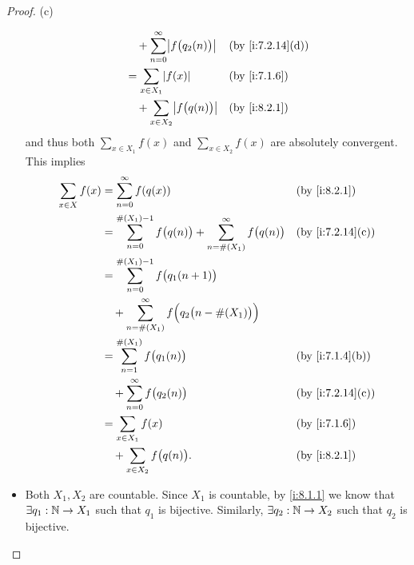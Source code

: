\begin{proof}{(c)}
\begin{itemize}
\begin{align*}
                                      & \quad + \sum_{n = 0}^\infty \abs{f\big(q_2(n)\big)}                                                  &  & \by{i:7.2.14}[d] \\
                                      & = \sum_{x \in X_1} \abs{f(x)}                                                                        &  & \by{i:7.1.6}     \\
                                      & \quad + \sum_{x \in X_2} \abs{f\big(q(n)\big)}                                                       &  & \by{i:8.2.1}
          \end{align*}
          and thus both \(\sum_{x \in X_1} f(x)\) and \(\sum_{x \in X_2} f(x)\) are absolutely convergent.
          This implies
          \begin{align*}
            \sum_{x \in X} f(x) & = \sum_{n = 0}^\infty f(q(x))                                                            &  & \by{i:8.2.1}     \\
                                & = \sum_{n = 0}^{\#(X_1) - 1} f\big(q(n)\big) + \sum_{n = \#(X_1)}^\infty f\big(q(n)\big) &  & \by{i:7.2.14}[c] \\
                                & = \sum_{n = 0}^{\#(X_1) - 1} f\big(q_1(n + 1)\big)                                                             \\
                                & \quad + \sum_{n = \#(X_1)}^\infty f\Big(q_2\big(n - \#(X_1)\big)\Big)                                          \\
                                & = \sum_{n = 1}^{\#(X_1)} f\big(q_1(n)\big)                                               &  & \by{i:7.1.4}[b]  \\
                                & \quad + \sum_{n = 0}^\infty f\big(q_2(n)\big)                                            &  & \by{i:7.2.14}[c] \\
                                & = \sum_{x \in X_1} f(x)                                                                  &  & \by{i:7.1.6}     \\
                                & \quad + \sum_{x \in X_2} f\big(q(n)\big).                                                &  & \by{i:8.2.1}
          \end{align*}
    \item Both \(X_1, X_2\) are countable.
          Since \(X_1\) is countable, by \cref{i:8.1.1} we know that \(\exists q_1 : \mathbb{N} \to X_1\) such that \(q_1\) is bijective.
          Similarly, \(\exists q_2 : \mathbb{N} \to X_2\) such that \(q_2\) is bijective.

\end{itemize}
\end{proof}
